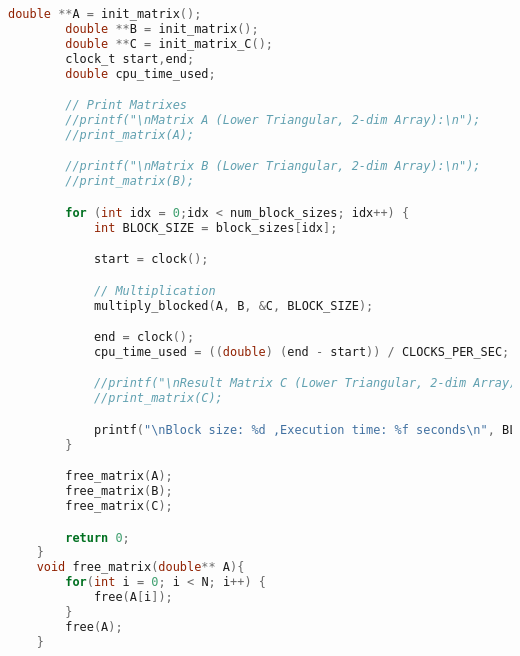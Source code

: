 \documentclass[14pt, russian]{matmex-diploma-custom}
\begin{document}
{\begin{lstlisting}[language=C, caption={Приложение 2D массивов с блочной оптимизацией}]
        double **A = init_matrix();
        double **B = init_matrix();
        double **C = init_matrix_C();
        clock_t start,end;
        double cpu_time_used;

        // Print Matrixes
        //printf("\nMatrix A (Lower Triangular, 2-dim Array):\n");
        //print_matrix(A);

        //printf("\nMatrix B (Lower Triangular, 2-dim Array):\n");
        //print_matrix(B);

        for (int idx = 0;idx < num_block_sizes; idx++) {
            int BLOCK_SIZE = block_sizes[idx];

            start = clock();

            // Multiplication
            multiply_blocked(A, B, &C, BLOCK_SIZE);

            end = clock();
            cpu_time_used = ((double) (end - start)) / CLOCKS_PER_SEC;

            //printf("\nResult Matrix C (Lower Triangular, 2-dim Array):\n");
            //print_matrix(C);

            printf("\nBlock size: %d ,Execution time: %f seconds\n", BLOCK_SIZE,cpu_time_used);
        }

        free_matrix(A);
        free_matrix(B);
        free_matrix(C);

        return 0;
    }
    void free_matrix(double** A){
        for(int i = 0; i < N; i++) {
            free(A[i]);
        }
        free(A);
    }

\end{lstlisting}
}
\end{document}
